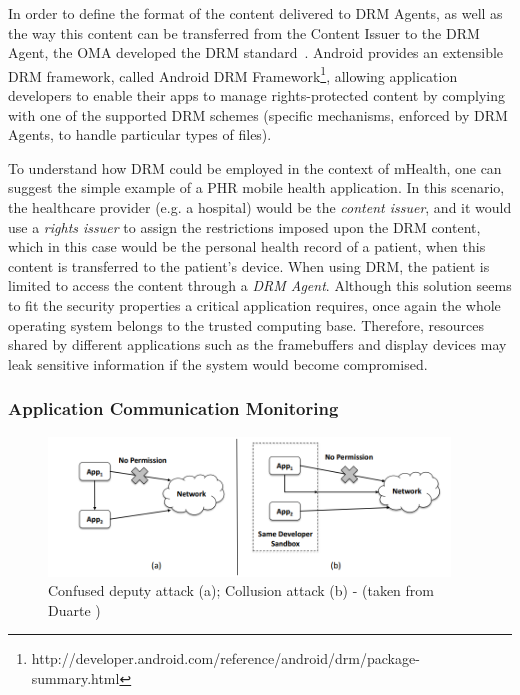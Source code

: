 In order to define the format of the content delivered to DRM Agents, as well as the way this content can be transferred from the Content Issuer to the DRM Agent, the \ac{OMA} developed the DRM standard~\cite{drm}. Android provides an extensible DRM framework, called Android DRM Framework\footnote{http://developer.android.com/reference/android/drm/package-summary.html}, allowing application developers to enable their apps to manage rights-protected content by complying with one of the supported DRM schemes (specific mechanisms, enforced by DRM Agents, to handle particular types of files).

To understand how \ac{DRM} could be employed in the context of mHealth, one can suggest the simple example of a \ac{PHR} mobile health application. In this scenario, the healthcare provider (e.g. a hospital) would be the \emph{content issuer}, and it would use a \emph{rights issuer} to assign the restrictions imposed upon the \ac{DRM} content, which in this case would be the personal health record of a patient, when this content is transferred to the patient's device. When using \ac{DRM}, the patient is limited to access the content through a \emph{\ac{DRM} Agent}. Although this solution seems to fit the security properties a critical application requires, once again the whole operating system belongs to the trusted computing base. Therefore, resources shared by different applications such as the framebuffers and display devices may leak sensitive information if the system would become compromised.

\subsubsection{Application Communication Monitoring}

\begin{figure}[t!]
	\centering
	\includegraphics[width=0.95\textwidth]{img/communicationattacks.png}
	\caption{Confused deputy attack (a); Collusion attack (b) - (taken from Duarte \cite{nunoduarte})}
	\label{fig:communicationattacks}
\end{figure}

